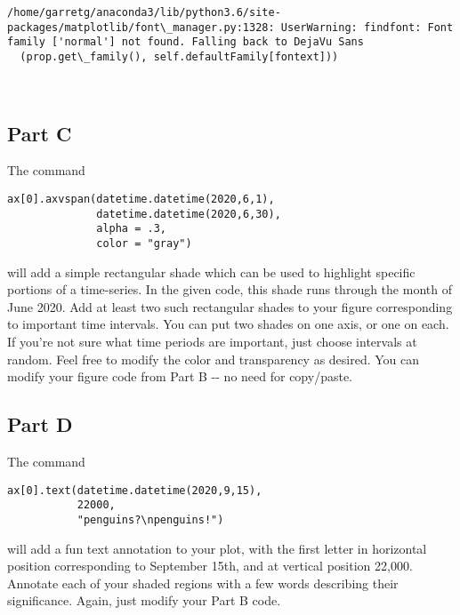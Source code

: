 \documentclass[11pt]{article}
\begin{document}
    \begin{Verbatim}[commandchars=\\\{\}]
/home/garretg/anaconda3/lib/python3.6/site-packages/matplotlib/font\_manager.py:1328: UserWarning: findfont: Font family ['normal'] not found. Falling back to DejaVu Sans
  (prop.get\_family(), self.defaultFamily[fontext]))

    \end{Verbatim}

    \begin{center}
    \end{center}
    { \hspace*{\fill} \\}
    
    \subsection{Part C}\label{part-c}

The command

\begin{verbatim}
ax[0].axvspan(datetime.datetime(2020,6,1),
              datetime.datetime(2020,6,30), 
              alpha = .3, 
              color = "gray")
\end{verbatim}

will add a simple rectangular shade which can be used to highlight
specific portions of a time-series. In the given code, this shade runs
through the month of June 2020. Add at least two such rectangular shades
to your figure corresponding to important time intervals. You can put
two shades on one axis, or one on each. If you're not sure what time
periods are important, just choose intervals at random. Feel free to
modify the color and transparency as desired. You can modify your figure
code from Part B -\/- no need for copy/paste.

\subsection{Part D}\label{part-d}

The command

\begin{verbatim}
ax[0].text(datetime.datetime(2020,9,15), 
           22000, 
           "penguins?\npenguins!")
\end{verbatim}

will add a fun text annotation to your plot, with the first letter in
horizontal position corresponding to September 15th, and at vertical
position 22,000. Annotate each of your shaded regions with a few words
describing their significance. Again, just modify your Part B code.
\end{document}
